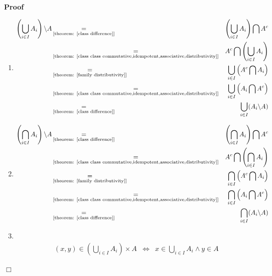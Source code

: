 \documentclass{book}
\newcommand{\equallim}{\mathop{=}\limits}
\newenvironment{proof}{\noindent\textbf{Proof\ }}{\hspace*{\fill}$\Box$\medskip}
\begin{document}
\begin{proof}
  
  \begin{enumerate}
    \item 
    \begin{eqnarray*}
      \left( \bigcup_{i \in I} A_i \right) \backslash A &
      \equallim_{\text{[theorem: \ref{class difference}]}} & \left( \bigcup_{i
      \in I} A_i \right) \bigcap A^c\\
      & \equallim_{\text{[theorem: \ref{class class
      commutative,idempotent,associative,distributivity}]}} & A^c \bigcap
      \left( \bigcup_{i \in I} A_i \right)\\
      & \equallim_{\text{[theorem: \ref{family distributivity}]}} &
      \bigcup_{i \in I} \left( A^c \bigcap A_i \right)\\
      & \equallim_{\text{[theorem: \ref{class class
      commutative,idempotent,associative,distributivity}]}} & \bigcup_{i \in
      I} \left( A_i \bigcap A^c \right)\\
      & \equallim_{\text{[theorem: \ref{class difference}]}} & \bigcup_{i \in
      I} (A_i \backslash A)
    \end{eqnarray*}
    \item 
    \begin{eqnarray*}
      \left( \bigcap_{i \in I} A_i \right) \backslash A &
      \equallim_{\text{[theorem: \ref{class difference}]}} & \left( \bigcap_{i
      \in I} A_i \right) \bigcap A^c\\
      & \equallim_{\text{[theorem: \ref{class class
      commutative,idempotent,associative,distributivity}]}} & A^c \bigcap
      \left( \bigcap_{i \in I} A_i \right)\\
      & \equallim_{\text{[theorem: \ref{family distributivity}]}} &
      \bigcap_{i \in I} \left( A^c \bigcap A_i \right)\\
      & \equallim_{\text{[theorem: \ref{class class
      commutative,idempotent,associative,distributivity}]}} & \bigcap_{i \in
      I} \left( A_i \bigcap A^c \right)\\
      & \equallim_{\text{[theorem: \ref{class difference}]}} & \bigcap_{i \in
      I} (A_i \backslash A)
    \end{eqnarray*}
    \item  \
    \begin{eqnarray*}
      (x, y) \in \left( \bigcup_{i \in I} A_i \right) \times A &
      \Leftrightarrow & x \in \bigcup_{i \in I} A_i \wedge y \in A\\

\end{eqnarray*}
\end{enumerate}
\end{proof}
\end{document}
